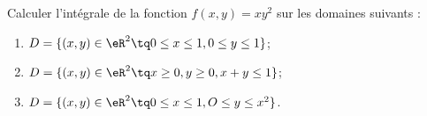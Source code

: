 
\begin{exercice}\label{exoOutilsMath-0101}

    Calculer l'intégrale de la fonction $f(x,y)=xy^2$ sur les domaines suivants :
    \begin{enumerate}
        \item
            $D=\{ (x,y)\in\eR^2\tq 0\leq x\leq 1, 0\leq y\leq 1 \}$;
        \item
            $D=\{ (x,y)\in\eR^2\tq x\geq 0,y\geq 0,x+y\leq 1 \}$;
        \item
            $D=\{ (x,y)\in\eR^2\tq 0\leq x\leq 1,O\leq y\leq x^2 \}$.
    \end{enumerate}

\end{exercice}
